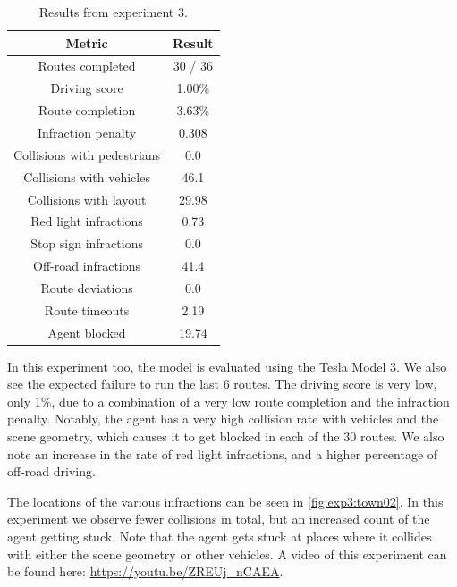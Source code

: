 \begin{table}[]
    \centering
    \begin{tabular}{|c|c|}
        \hline
        \textbf{Metric} & \textbf{Result} \\ \hline
        Routes completed & 30 / 36 \\ \hline
        Driving score & 1.00\% \\ \hline
        Route completion & 3.63\% \\ \hline
        Infraction penalty & 0.308 \\ \hline
        Collisions with pedestrians & 0.0 \\ \hline
        Collisions with vehicles & 46.1 \\ \hline
        Collisions with layout & 29.98 \\ \hline
        Red light infractions & 0.73 \\ \hline
        Stop sign infractions & 0.0 \\ \hline
        Off-road infractions & 41.4 \\ \hline
        Route deviations & 0.0 \\ \hline
        Route timeouts & 2.19 \\ \hline
        Agent blocked & 19.74 \\ \hline
    \end{tabular}
    \caption{Results from experiment 3.}
    \label{tab:exp3:results}
\end{table}

In this experiment too, the model is evaluated using the Tesla Model 3.
We also see the expected failure to run the last 6 routes.
The driving score is very low, only 1\%,
due to a combination of a very low route completion and the infraction penalty.
Notably, the agent has a very high collision rate with vehicles and the scene geometry,
which causes it to get blocked in each of the 30 routes.
We also note an increase in the rate of red light infractions,
and a higher percentage of off-road driving.

The locations of the various infractions can be seen in \cref{fig:exp3:town02}.
In this experiment we observe fewer collisions in total,
but an increased count of the agent getting stuck.
Note that the agent gets stuck at places where it collides with either the scene geometry or other vehicles. A video of this experiment can be found here: \url{https://youtu.be/ZREUj_nCAEA}.

